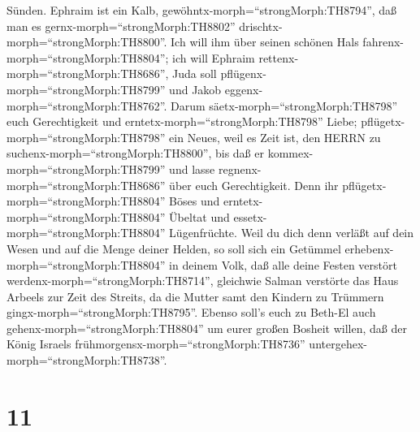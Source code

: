 Sünden.  Ephraim ist ein Kalb,
gewöhntx-morph=``strongMorph:TH8794'', daß man es
gernx-morph=``strongMorph:TH8802''
drischtx-morph=``strongMorph:TH8800''. Ich will ihm über seinen schönen
Hals fahrenx-morph=``strongMorph:TH8804''; ich will Ephraim
rettenx-morph=``strongMorph:TH8686'', Juda soll
pflügenx-morph=``strongMorph:TH8799'' und Jakob
eggenx-morph=``strongMorph:TH8762''.  Darum
säetx-morph=``strongMorph:TH8798'' euch Gerechtigkeit und
erntetx-morph=``strongMorph:TH8798'' Liebe;
pflügetx-morph=``strongMorph:TH8798'' ein Neues, weil es Zeit ist, den
HERRN zu suchenx-morph=``strongMorph:TH8800'', bis daß er
kommex-morph=``strongMorph:TH8799'' und lasse
regnenx-morph=``strongMorph:TH8686'' über euch Gerechtigkeit.
 Denn ihr pflügetx-morph=``strongMorph:TH8804'' Böses und
erntetx-morph=``strongMorph:TH8804'' Übeltat und
essetx-morph=``strongMorph:TH8804'' Lügenfrüchte.  Weil du
dich denn verläßt auf dein Wesen und auf die Menge deiner Helden, so
soll sich ein Getümmel erhebenx-morph=``strongMorph:TH8804'' in deinem
Volk, daß alle deine Festen verstört
werdenx-morph=``strongMorph:TH8714'', gleichwie Salman verstörte das
Haus Arbeels zur Zeit des Streits, da die Mutter samt den Kindern zu
Trümmern gingx-morph=``strongMorph:TH8795''.  Ebenso soll's
euch zu Beth-El auch gehenx-morph=``strongMorph:TH8804'' um eurer großen
Bosheit willen, daß der König Israels
frühmorgensx-morph=``strongMorph:TH8736''
untergehex-morph=``strongMorph:TH8738''.

\hypertarget{section-10}{%
\section{11}\label{section-10}}

